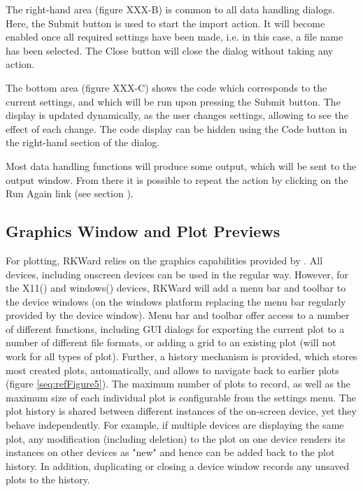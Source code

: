 The right-hand area (figure XXX-B) is common to all data handling
dialogs. Here, the Submit button is used
to start the import action. It will become enabled once all required
settings have been made, i.e. in this case, a file name has been
selected. The Close button will close the
dialog without taking any action.

The bottom area (figure XXX-C) shows the 
code which corresponds to the current settings, and which will be run
upon pressing the Submit button. The
display is updated dynamically, as the user changes settings, allowing
to see the effect of each change. The code display can be hidden using
the Code button in the right-hand section
of the dialog.

Most data handling functions will produce some output, which will be
sent to the output window. From there it is possible to repeat the
action by clicking on the Run Again link
(see section ).

\subsection{Graphics Window and Plot Previews}
\label{sec:plot_previews}

For plotting, RKWard relies on the graphics capabilities provided by
. All 
devices, including onscreen devices can be used in the regular way.
However, for the X11() and windows() devices, RKWard will add a menu
bar and toolbar to the device windows (on the windows platform
replacing the menu bar regularly provided by the device window). Menu
bar and toolbar offer access to a number of different functions,
including GUI dialogs for exporting the current plot to a number of
different file formats, or adding a grid to an existing plot (will not
work for all types of plot). Further, a history mechanism is provided,
which stores most created plots, automatically, and allows to navigate
back to earlier plots (figure \ref{seq:refFigure5}). The maximum number
of plots to record, as well as the maximum size of each individual plot
is configurable from the settings menu. The plot history is shared
between different instances of the on{}-screen device, yet they behave
independently. For example, if multiple devices are displaying the same
plot, any modification (including deletion) to the plot on one device
renders its instances on other devices as "new" and hence can be added
back to the plot history. In addition, duplicating or closing a device
window records any unsaved plots to the history.

